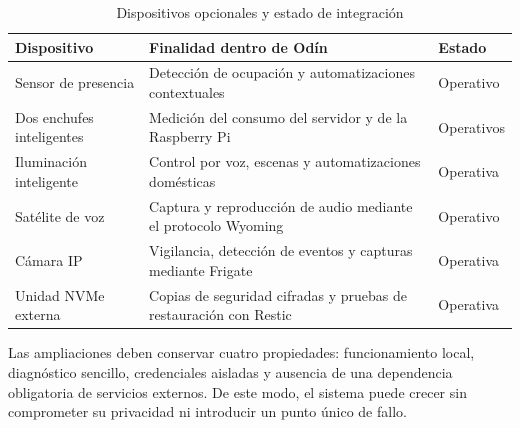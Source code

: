 \begin{table}[H]
  \centering
  \caption{Dispositivos opcionales y estado de integración}
  \label{tab:dispositivos-opcionales}
  \small
  \renewcommand{\arraystretch}{1.18}
  \begin{tabularx}{\textwidth}{
    >{\raggedright\arraybackslash}p{}
    >{\raggedright\arraybackslash}X
    >{\raggedright\arraybackslash}p{}}
    \toprule
    Dispositivo & Finalidad dentro de Odín & Estado \\
    \midrule
    Sensor de presencia & Detección de ocupación y automatizaciones contextuales & Operativo \\
    Dos enchufes inteligentes & Medición del consumo del servidor y de la Raspberry Pi & Operativos \\
    Iluminación inteligente & Control por voz, escenas y automatizaciones domésticas & Operativa \\
    Satélite de voz & Captura y reproducción de audio mediante el protocolo Wyoming & Operativo \\
    Cámara IP & Vigilancia, detección de eventos y capturas mediante Frigate & Operativa \\
    Unidad NVMe externa & Copias de seguridad cifradas y pruebas de restauración con Restic & Operativa \\
    \bottomrule
  \end{tabularx}
\end{table}

Las ampliaciones deben conservar cuatro propiedades: funcionamiento local, diagnóstico sencillo, credenciales aisladas y ausencia de una dependencia obligatoria de servicios externos. De este modo, el sistema puede crecer sin comprometer su privacidad ni introducir un punto único de fallo.
